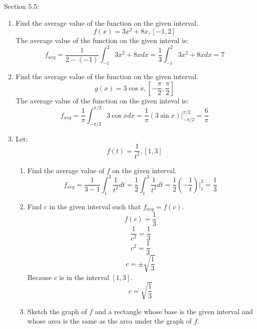\documentclass[12pt]{article}
\begin{document}
Section 5.5:

\begin{enumerate}
    \item Find the average value of the function on the given interval.
    \[f(x) = 3x^2 + 8x, [-1,2]\]
    The average value of the function on the given inteval is:
    \[f_{avg} = \frac{1}{2-(-1)}\int_{-1}^2 3x^2 + 8x dx = \frac{1}{3}\int_{-1}^2 3x^2 + 8x dx = 7\]

\setcounter{enumi}{2}
    \item Find the average value of the function on the given interval.
    \[g(x) = 3\cos x ,[-\frac{\pi}{2},\frac{\pi}{2}] \]
    The average value of the function on the given inteval is:
    \[f_{avg} = \frac{1}{\pi}\int_{-\pi/2}^{\pi/2} 3\cos x dx = \frac{1}{\pi}(3\sin x)|_{-\pi/2}^{\pi/2} = \frac{6}{\pi}\]

\setcounter{enumi}{8}
    \item Let:
    \[f(t) = \frac{1}{t^2}, [1,3]\]
    \begin{enumerate}
        \item Find the average value of $f$ on the given interval.
        \[f_{avg} = \frac{1}{3-1}\int_1^3 \frac{1}{t^2} dt = \frac{1}{2}\int_1^3 \frac{1}{t^2} dt = \frac{1}{2}(-\frac{1}{t})|_{1}^{3} = \frac{1}{3}\]
        \item Find $c$ in the given interval such that $f_{avg} = f(c)$.
        \[f(c) = \frac{1}{3}\]
        \[\frac{1}{c^2} = \frac{1}{3}\]
        \[c^2 = \frac{1}{3}\]
        \[c = \pm \sqrt{\frac{1}{3}}\]
        Because $c$ is in the interval $[1,3]$.
        \[c = \sqrt{\frac{1}{3}}\]
        \item Sketch the graph of $f$ and a rectangle whose base is the given interval and whose area is the same as the area under the graph of $f$.
    \end{enumerate}
    \begin{center}
    \end{center}


\end{enumerate}
\end{document}
